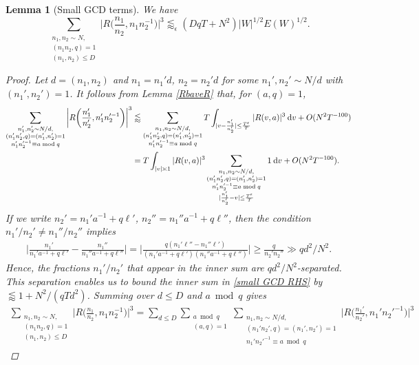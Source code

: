 \documentclass[12pt]{amsart}
\newtheorem{lemma}[theorem]{Lemma}
\theoremstyle{definition}
\theoremstyle{plain}
\theoremstyle{remark}
\numberwithin{equation}{section}
\numberwithin{theorem}{section}
\numberwithin{equation}{section}
\begin{document}
	\begin{lemma}[Small GCD terms] \label{sgcd}
		We have
		\[\sum_{\substack{n_{1}, n_{2} \sim N, \\ (n_1n_2, q)=1  \\ (n_{1}, n_{2}) \leq D}}\bigg|R\bigg(\frac{n_{1}}{n_{2}}, n_{1}n_{2}^{-1}\bigg)\bigg|^{3} \lessapprox_{\epsilon} (DqT+N^{2})|W|^{1/2}E(W)^{1/2}.\]
		\begin{proof}
			Let $d=(n_{1}, n_{2})$ and $n_{1}=n_{1}'d$, $n_{2}=n_{2}'d$ for some $n_{1}', n_{2}' \sim N/d$ with $(n_{1}', n_{2}')=1$. It follows from Lemma \ref{RbaveR} that, for $(a, q)=1$,
			\begin{align}
				\sum_{\substack{n_1', n_2' \sim N/d, \\ (n_1'n_2', q)=(n_1', n_2')=1  \\ n_{1}'n_{2}'^{-1} \equiv a\bmod q}}\bigg|R\bigg(\frac{n_{1}'}{n_{2}'}, n_{1}'n_{2}'^{-1}\bigg)\bigg|^{3}
				&\lessapprox
				\sum_{\substack{n_{1}, n_{2} \sim N/d, \\ (n_1'n_2', q)=(n_{1}',n_2')=1  \\ n_{1}'n_{2}'^{-1} \equiv a \bmod q}}T\int_{|v-\frac{n_{1}'}{n_{2}'}|\leq \frac{T^{\epsilon}}{T}}|R(v, a)|^{3}\:\mathrm{d}v+O(N^{2}T^{-100}) \notag
				\\
				&=T\int_{|v|\asymp 1}|R(v, a)|^{3}
				\sum_{\substack{n_{1}, n_{2} \sim N/d, \\ (n_{1}'n_2', q)=(n_{1}', n_2')=1  \\ n_{1}'n_{2}'^{-1} \equiv a \bmod q \\ |\frac{n_{1}'}{n_{2}'}-v|\leq \frac{T^{\epsilon}}{T}}}1\:\mathrm{d}v+O(N^{2}T^{-100}). \label{small GCD RHS}
			\end{align}
			If we write $n_{2}'=n_{1}'a^{-1}+q\ell'$, $n_{2}''=n_{1}''a^{-1}+q\ell''$, then  the condition $n_{1}'/n_{2}' \neq n_{1}''/n_{2}''$ implies
			\begin{align*}
				\bigg|\frac{n_{1}'}{n_{1}'a^{-1}+q\ell'}-\frac{n_{1}''}{n_{1}''a^{-1}+q\ell''}\bigg|=
				\bigg|\frac{q(n_{1}'\ell''-n_{1}''\ell')}{(n_{1}'a^{-1}+q\ell')(n_{1}''a^{-1}+q\ell'')}\bigg|\geq
				\frac{q}{n_{2}'n_{2}''} \gg qd^{2}/N^{2}.
			\end{align*}
			Hence, the fractions $n_{1}'/n_{2}'$ that appear in the inner sum are $qd^{2}/N^{2}$-separated. This separation enables us to bound the inner sum in \eqref{small GCD RHS} by $\lessapprox 1+ N^{2}/(qTd^{2})$. Summing over $d \leq D$ and $a \bmod q$ gives 
			\begin{align*}
				\sum_{\substack{n_{1}, n_{2} \sim N, \\ (n_{1}n_{2}, q)=1  \\ (n_{1}, n_{2}) \leq D}}\bigg|R\bigg(\frac{n_{1}}{n_{2}}, n_{1}n_{2}^{-1}\bigg)\bigg|^{3} =\sum_{d \leq D} \sum_{\substack{a \bmod q \\ (a, q)=1}}\sum_{\substack{n_{1}, n_{2} \sim N/d, \\ (n_{1}'n_{2}', q)=(n_1',n_2')=1  \\  n_{1}'n_{2}'^{-1} \equiv a \bmod q}}\bigg|R\bigg(\frac{n_{1}'}{n_{2}'}, n_{1}'n_{2}'^{-1}\bigg)\bigg|^{3}

\end{align*}
\end{proof}
\end{lemma}
\end{document}
